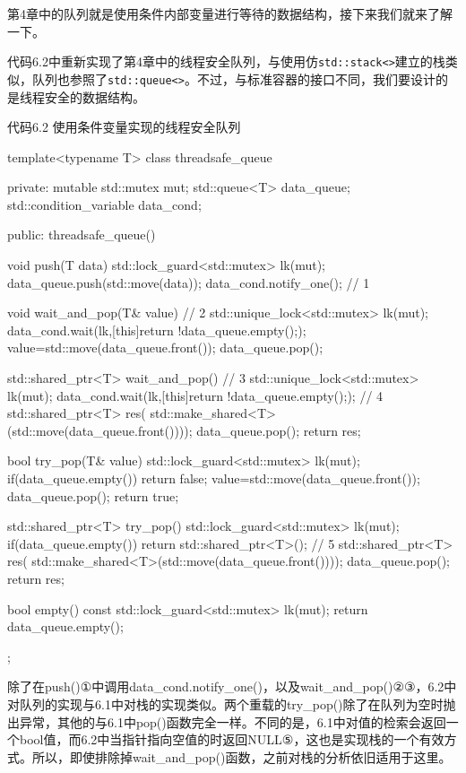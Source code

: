第4章中的队列就是使用条件内部变量进行等待的数据结构，接下来我们就来了解一下。


代码6.2中重新实现了第4章中的线程安全队列，与使用仿\texttt{std::stack<>}建立的栈类似，队列也参照了\texttt{std::queue<>}。不过，与标准容器的接口不同，我们要设计的是线程安全的数据结构。

代码6.2 使用条件变量实现的线程安全队列

\begin{cpp}
template<typename T>
class threadsafe_queue
{
private:
  mutable std::mutex mut;
  std::queue<T> data_queue;
  std::condition_variable data_cond;

public:
  threadsafe_queue()
  {}

  void push(T data)
  {
    std::lock_guard<std::mutex> lk(mut);
    data_queue.push(std::move(data));
    data_cond.notify_one();  // 1
  }

  void wait_and_pop(T& value)  // 2
  {
    std::unique_lock<std::mutex> lk(mut);
    data_cond.wait(lk,[this]{return !data_queue.empty();});
    value=std::move(data_queue.front());
    data_queue.pop();
  }

  std::shared_ptr<T> wait_and_pop()  // 3
  {
    std::unique_lock<std::mutex> lk(mut);
    data_cond.wait(lk,[this]{return !data_queue.empty();});  // 4
    std::shared_ptr<T> res(
      std::make_shared<T>(std::move(data_queue.front())));
    data_queue.pop();
    return res;
  }

  bool try_pop(T& value)
  {
    std::lock_guard<std::mutex> lk(mut);
    if(data_queue.empty())
      return false;
    value=std::move(data_queue.front());
    data_queue.pop();
    return true;
  }

  std::shared_ptr<T> try_pop()
  {
    std::lock_guard<std::mutex> lk(mut);
    if(data_queue.empty())
      return std::shared_ptr<T>();  // 5
    std::shared_ptr<T> res(
      std::make_shared<T>(std::move(data_queue.front())));
    data_queue.pop();
    return res;
  }

  bool empty() const
  {
    std::lock_guard<std::mutex> lk(mut);
    return data_queue.empty();
  }
};
\end{cpp}

除了在push()①中调用data\_cond.notify\_one()，以及wait\_and\_pop()②③，6.2中对队列的实现与6.1中对栈的实现类似。两个重载的try\_pop()除了在队列为空时抛出异常，其他的与6.1中pop()函数完全一样。不同的是，6.1中对值的检索会返回一个bool值，而6.2中当指针指向空值的时返回NULL⑤，这也是实现栈的一个有效方式。所以，即使排除掉wait\_and\_pop()函数，之前对栈的分析依旧适用于这里。

